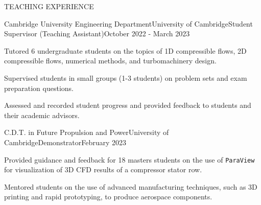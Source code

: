 \documentclass{resume} %
\begin{document}
\begin{rSection}{TEACHING EXPERIENCE}

\begin{rSubsection}
{Cambridge University Engineering Department}{University of Cambridge}{Student Supervisor (Teaching Assistant)}{October 2022 - March 2023}
\item Tutored 6 undergraduate students on the topics of 1D compressible flows, 2D compressible flows, numerical methods, and turbomachinery design. 
\item Supervised students in small groups (1-3 students) on problem sets and exam preparation questions. 
\item Assessed and recorded student progress and provided feedback to students and their academic advisors.
\end{rSubsection}

\begin{rSubsection}
{C.D.T. in Future Propulsion and Power}{University of Cambridge}{Demonstrator}{February 2023}
\item Provided guidance and feedback for 18 masters students on the use of \texttt{ParaView} for visualization of 3D CFD results of a compressor stator row. 
\item Mentored students on the use of advanced manufacturing techniques, such as 3D printing and rapid prototyping, to produce aerospace components.
\end{rSubsection}

\end{rSection}
\end{document}
